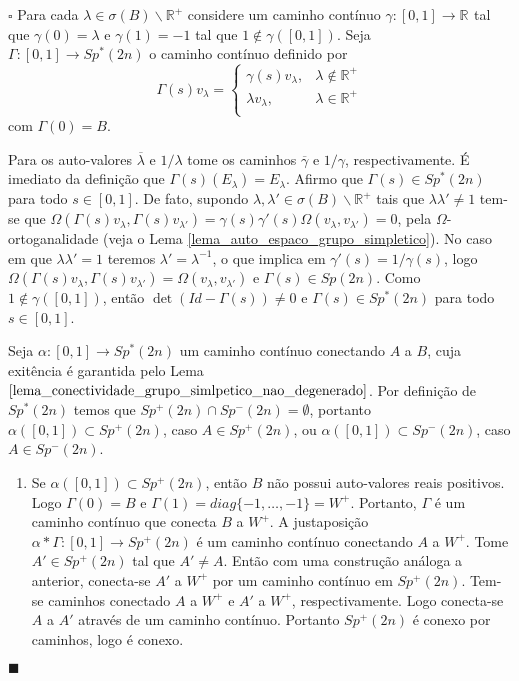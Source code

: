 \documentclass[12pt]{book}
\newenvironment{prova}[1]{$\square$ #1}{\hfill$\blacksquare$}
\newcommand{\complementar}[2]{#1 \backslash #2}
\newcommand{\espectrooperador}[1]{\sigma(#1)}
\newcommand{\formaSimpleticaExtendida}[2]{\Omega(#1, #2)}
\newcommand{\funcaocond}[5]{
	#1 = 
	\left\{
	\begin{array}{cc}
		#2, & #3\\
		#4, & #5\\
	\end{array}
	\right.
}
\newcommand{\gruposimpletico}[1]{Sp(#1)}
\newcommand{\gruposimpleticonaodegenerado}[1]{Sp^{#1}(2n)}
\newcommand{\intervalo}{[0,1]}
\newcommand{\real}[1]{\mathbb{R}^{#1}}
\newcommand{\reta}{\real{}}
\begin{document}
\begin{prova}
		Para cada $\lambda \in \complementar{\espectrooperador{B}}{\real{+}}$ considere um caminho contínuo $\gamma:[0,1]\to \reta$ tal que $\gamma(0) = \lambda$ e $\gamma(1) = -1$ tal que $1 \notin \gamma([0,1])$. Seja $\Gamma:[0,1 ]\to \gruposimpleticonaodegenerado{*}$ o caminho contínuo definido por
		$$
		\funcaocond{\Gamma(s)v_{\lambda}}{\gamma(s)v_{\lambda}}{\lambda \notin \real{+}}{\lambda v_{\lambda} }{\lambda \in \real{+}}
		$$
		com $\Gamma(0) = B$. 
		
		Para os auto-valores $\overline{\lambda}$ e $1/\lambda$ tome os caminhos $\overline{\gamma}$ e $1/\gamma$, respectivamente. É imediato da definição que $\Gamma(s)(E_{\lambda}) = E_{\lambda}$. Afirmo que $\Gamma(s) \in \gruposimpleticonaodegenerado{*}$ para todo $s\in \intervalo$. De fato, supondo $\lambda,\lambda' \in \complementar{\sigma(B)}{\real{+}}$ tais que $\lambda\lambda' \neq 1$ tem-se que $\formaSimpleticaExtendida{\Gamma(s)v_{\lambda}}{\Gamma(s)v_{\lambda'}}= \gamma(s)\gamma'(s)\formaSimpleticaExtendida{v_{\lambda}}{v_{\lambda'}} = 0$, pela $\Omega$-ortoganalidade (veja o Lema \ref{lema_auto_espaco_grupo_simpletico}). No caso em que $\lambda\lambda'=1$ teremos $\lambda'=\lambda^{-1}$, o que implica em $\gamma'(s) = 1/\gamma(s)$, logo $\Omega(\Gamma(s)v_{\lambda},\Gamma(s)v_{\lambda'}) = \Omega(v_{\lambda},v_{\lambda'})$ e $\Gamma(s) \in \gruposimpletico{2n}$. Como $1 \notin \gamma(\intervalo)$, então $\det(Id - \Gamma(s))\neq 0 $ e $\Gamma(s)\in \gruposimpleticonaodegenerado{*}$ para todo $s\in \intervalo$.
		
		Seja $\alpha:\intervalo\to \gruposimpleticonaodegenerado{*}$ um caminho contínuo conectando $A$ a $B$, cuja exitência é garantida pelo Lema $\ref{lema_conectividade_grupo_simlpetico_nao_degenerado}$.
		Por definição de $\gruposimpleticonaodegenerado{*}$ temos que $\gruposimpleticonaodegenerado{+} \cap \gruposimpleticonaodegenerado{-}=\emptyset$, portanto $\alpha([0,1]) \subset \gruposimpleticonaodegenerado{+}$, caso $A \in \gruposimpleticonaodegenerado{+}$, ou $\alpha([0,1]) \subset \gruposimpleticonaodegenerado{-}$, caso $A\in \gruposimpleticonaodegenerado{-}$.
		
		\begin{enumerate}
			\item Se $\alpha([0,1]) \subset \gruposimpleticonaodegenerado{+}$, então $B$ não possui auto-valores reais positivos. Logo $\Gamma(0) = B$ e $\Gamma(1) = diag \{-1, \dots, -1\} = W^{+}$. Portanto, $\Gamma$ é um caminho contínuo que conecta $B$ a $W^{+}$. A justaposição $\alpha * \Gamma:\intervalo \to \gruposimpleticonaodegenerado{+}$
			é um caminho contínuo conectando $A$ a $W^{+}$. Tome $A' \in \gruposimpleticonaodegenerado{+}$ tal que $A'\neq A$. Então com uma construção análoga a anterior, conecta-se $A'$ a $W^{+}$ por um caminho contínuo em $\gruposimpleticonaodegenerado{+}$. Tem-se caminhos conectado $A$ a $W^{+}$ e $A'$ a $W^{+}$, respectivamente. Logo conecta-se $A$ a $A'$ através de um caminho contínuo. Portanto $\gruposimpleticonaodegenerado{+}$ é conexo por caminhos, logo é conexo.
			

\end{enumerate}
\end{prova}
\end{document}

